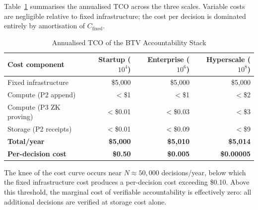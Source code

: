Table~\ref{tab:tco} summarises the annualised TCO across the three
scales. Variable costs are negligible relative to fixed infrastructure;
the cost per decision is dominated entirely by amortisation of
$C_{\text{fixed}}$.

\begin{table}[h]
\centering
\caption{Annualised TCO of the BTV Accountability Stack}
\label{tab:tco}
\begin{tabular}{lrrr}
\toprule
\textbf{Cost component}
  & \textbf{Startup} ($10^4$)
  & \textbf{Enterprise} ($10^6$)
  & \textbf{Hyperscale} ($10^8$) \\
\midrule
Fixed infrastructure        & \$5{,}000    & \$5{,}000    & \$5{,}000    \\
Compute (P2 append)         & $<$\$1       & $<$\$1       & $<$\$2       \\
Compute (P3 ZK proving)     & $<$\$0.01    & $<$\$0.03    & $<$\$3       \\
Storage (P2 receipts)       & $<$\$0.01    & $<$\$0.09    & $<$\$9       \\
\midrule
\textbf{Total/year}         & \textbf{\$5{,}000} & \textbf{\$5{,}010} & \textbf{\$5{,}014} \\
\textbf{Per-decision cost}  & \textbf{\$0.50}    & \textbf{\$0.005}   & \textbf{\$0.00005} \\
\bottomrule
\end{tabular}
\end{table}

\noindent The knee of the cost curve occurs near $N \approx 50{,}000$
decisions/year, below which the fixed infrastructure cost produces a
per-decision cost exceeding \$0.10. Above this threshold, the marginal
cost of verifiable accountability is effectively zero: all additional
decisions are verified at storage cost alone.

